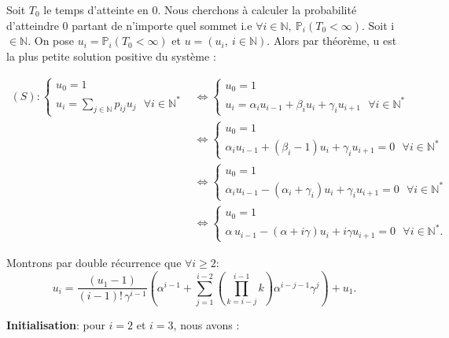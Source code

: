 \documentclass[12pt,a4paper]{report}
\theoremstyle{remark}
\begin{document}
Soit $T_0$ le temps d'atteinte en 0. Nous cherchons à calculer la probabilité d'atteindre 0 partant de n'importe quel sommet i.e $\forall i\in \mathbb{N}, \ \mathbb{P}_i(T_0 < \infty)$. Soit i$\in\mathbb{N}$. On pose $u_i=\mathbb{P}_i(T_0< \infty)$ et $u=(u_i,\  i\in \mathbb{N})$. Alors par théorème, u est la plus petite solution  positive du système : 

\begin{align*}
(S) : \left\{
\begin{array}{ll}
        u_0=1\\
        u_i= \sum\limits_{j\in \mathbb{N}} p_{ij}u_j \ \ \ \forall i \in \mathbb{N}^*
    \end{array}
\right.
&\Longleftrightarrow  \left\{
\begin{array}{ll}
        u_0=1\\
        u_i= \alpha_i u_{i-1} + \beta_i u_i + \gamma_i u_{i+1} \ \ \ \forall i \in \mathbb{N}^*
    \end{array}
\right.  \\
&\Longleftrightarrow \left\{
\begin{array}{ll}
        u_0=1\\
        \alpha_i u_{i-1} + (\beta_i-1) u_i + \gamma_i u_{i+1} = 0 \ \ \ \forall i \in \mathbb{N}^*
    \end{array}
\right.  \\
 &\Longleftrightarrow \left\{
\begin{array}{ll}
        u_0=1\\
        \alpha_i u_{i-1} - (\alpha_i+\gamma_i) u_i + \gamma_i u_{i+1} = 0 \ \ \ \forall i \in \mathbb{N}^*
    \end{array}
\right.  \\
 &\Longleftrightarrow \left\{
\begin{array}{ll}
        u_0=1\\
        \alpha \, u_{i-1} - (\alpha+ i\gamma) u_i + i\gamma u_{i+1} = 0 \ \ \ \forall i \in \mathbb{N}^*.
    \end{array}
\right. 
\end{align*}

Montrons par double récurrence que $\forall i \geqslant 2$:
$$u_i = \frac{(u_1 - 1)}{(i-1)! \, \gamma^{i-1}} \left( \alpha^{i-1} + \sum_{j=1}^{i-2}\left(\prod_{k=i-j}^{i-1} k\right) \alpha^{i-j-1} \gamma^j \right) + u_1.$$

\textbf{Initialisation}: pour $i=2$ et $i=3$, nous avons :
\end{document}
